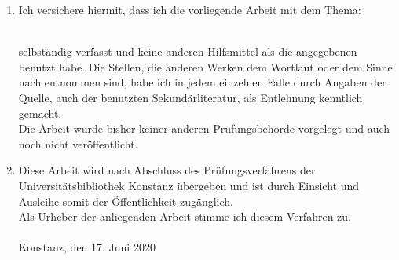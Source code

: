  \begin{enumerate}
     \item Ich versichere hiermit, dass ich die vorliegende Arbeit mit dem Thema:\\
         [0.5cm]
         \begin{minipage}{.9\textwidth}
             \begin{center}
                 \large\bf\rawtitle
             \end{center}
         \end{minipage}\\
         [0.5cm]
         selbständig verfasst und keine anderen Hilfsmittel als die angegebenen benutzt habe. Die Stellen, die anderen Werken dem Wortlaut oder dem Sinne nach entnommen sind, habe ich in jedem einzelnen Falle durch Angaben der Quelle, auch der benutzten Sekund\"arliteratur, als Entlehnung kenntlich gemacht.\\
         Die Arbeit wurde bisher keiner anderen Pr\"ufungsbeh\"orde vorgelegt und auch noch nicht ver\"offentlicht.
     \item Diese Arbeit wird nach Abschluss des Pr\"ufungsverfahrens der Universit\"atsbibliothek Konstanz \"ubergeben und ist durch Einsicht und Ausleihe somit der \"Offentlichkeit zug\"anglich.\\Als Urheber der anliegenden Arbeit stimme ich diesem Verfahren zu.\\
     \vspace{0.2cm}\\
     Konstanz, den 17. Juni 2020\\
     \begin{minipage}{.9\textwidth}
        \raggedleft \underline{\hspace{7.0cm}}
     \end{minipage}
 \end{enumerate}




